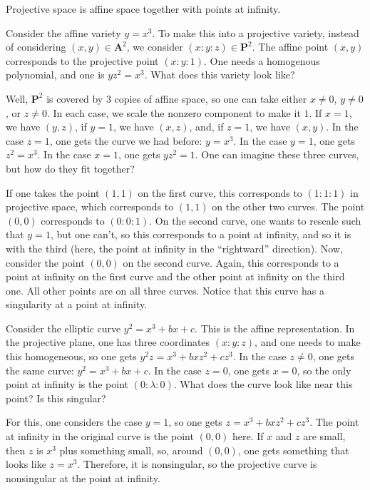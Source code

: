 \documentclass [11 pt, oneside] {article}
\begin{document}
Projective space is affine space together with points at infinity.
\begin{example}[ ]\label{}
Consider the affine variety $y=x^3$. To make this into a projective variety, instead of considering $(x,y) \in \mathbf{A}^2$, we consider $(x:y:z)\in \mathbf{P}^2$. The affine point $(x,y)$ corresponds to the projective point $(x:y:1)$. One needs a homogenous polynomial, and one is $yz^2 = x^3$. What does this variety look like?

Well, $\mathbf{P}^2$ is covered by $3$ copies of affine space, so one can take either $x\ne 0$, $y\ne 0$, or $z\ne 0$. In each case, we scale the nonzero component to make it $1$. If $x=1$, we have $(y,z)$, if $y=1$, we have $(x,z)$, and, if $z=1$, we have $(x,y)$. In the case $z=1$, one gets the curve we had before: $y=x^3$. In the case $y=1$, one gets $z^2 = x^3$. In the case $x=1$, one gets $yz^2 = 1$. One can imagine these three curves, but how do they fit together? 

If one takes the point $(1,1)$ on the first curve, this corresponds to $(1:1:1)$ in projective space, which corresponds to $(1,1)$ on the other two curves. The point $(0,0)$ corresponds to $(0:0:1)$. On the second curve, one wants to rescale such that $y=1$, but one can't, so this corresponds to a point at infinity, and so it is with the third (here, the point at infinity in the ``rightward'' direction). Now, consider the point $(0,0)$ on the second curve. Again, this corresponds to a point at infinity on the first curve and the other point at infinity on the third one. All other points are on all three curves. Notice that this curve has a singularity at a point at infinity.
\end{example}

\begin{example}[ ]\label{}
Consider the elliptic curve $y^2 = x^3+bx+c$. This is the affine representation. In the projective plane, one has three coordinates $(x:y:z)$, and one needs to make this homogeneous, so one gets $y^2z = x^3 + bxz^2 + cz^3$. In the case $z\ne 0$, one gets the same curve: $y^2 = x^3 + bx + c$. In the case $z=0$, one gets $x=0$, so the only point at infinity is the point $(0:\lambda:0)$. What does the curve look like near this point? Is this singular?

For this, one considers the case $y=1$, so one gets $z = x^3 + bxz^2 + cz^3$. The point at infinity in the original curve is the point $(0,0)$ here. If $x$ and $z$ are small, then $z$ is $x^3$ plus something small, so, around $(0,0)$, one gets something that looks like $z=x^3$. Therefore, it is nonsingular, so the projective curve is nonsingular at the point at infinity.
\end{example}
\end{document}
